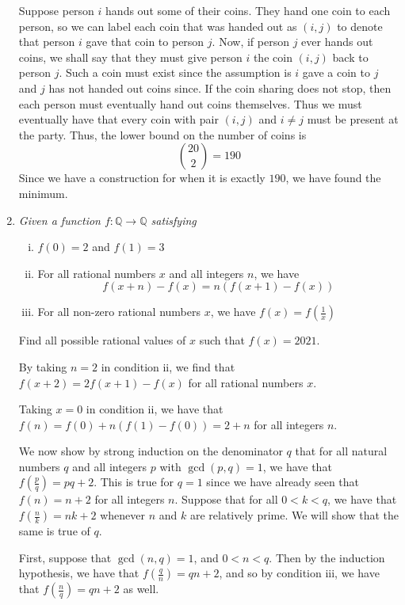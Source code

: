 \documentclass{article}
\begin{document}
\begin{enumerate}[1.]
Suppose person $i$ hands out some of their coins. They hand one coin to each person, so we can label each coin that was handed out as $(i, j)$ to denote that person $i$ gave that coin to person $j$. Now, if person $j$ ever hands out coins, we shall say that they must give person $i$ the coin $(i, j)$ back to person $j$. Such a coin must exist since the assumption is $i$ gave a coin to $j$ and $j$ has not handed out coins since. If the coin sharing does not stop, then each person must eventually hand out coins themselves. Thus we must eventually have that every coin with pair $(i, j)$ and $i \ne j$ must be present at the party. Thus, the lower bound on the number of coins is 
$$\binom{20}{2} = 190$$
Since we have a construction for when it is exactly $190$, we have found the minimum.

\item %
{\itshape Given a function $f: \mathbb{Q} \rightarrow \mathbb{Q}$ satisfying
\begin{enumerate}[i)]
  \item $f(0) = 2$ and $f(1) = 3$
  \item For all rational numbers $x$ and all integers $n$, we have 
  $$f(x + n) - f(x) = n(f(x + 1) - f(x)) $$
  \item For all non-zero rational numbers $x$, we have $f(x) = f(\frac{1}{x})$
\end{enumerate}
Find all possible rational values of $x$ such that $f(x) = 2021$.}

By taking $n = 2$ in condition ii, we find that $f(x + 2) = 2f(x + 1) - f(x)$ for all rational numbers $x$. 

Taking $x = 0$ in condition ii, we have that $f(n) = f(0) + n(f(1) - f(0)) = 2 + n$ for all integers $n$.

We now show by strong induction on the denominator $q$ that for all natural numbers $q$ and all integers $p$ with $\gcd(p, q) = 1$, we have that $f\left(\frac{p}{q}\right) = pq + 2$. This is true for $q = 1$ since we have already seen that $f(n) = n + 2$ for all integers $n$. Suppose that for all $0 < k < q$, we have that $f\left(\frac{n}{k}\right) = nk + 2$ whenever $n$ and $k$ are relatively prime. We will show that the same is true of $q$.

First, suppose that $\gcd(n, q) = 1$, and $0 < n < q$. Then by the induction hypothesis, we have that $f\left(\frac{q}{n}\right) = qn + 2$, and so by condition iii, we have that $f\left(\frac{n}{q}\right) = qn + 2$ as well.


\end{enumerate}
\end{document}
